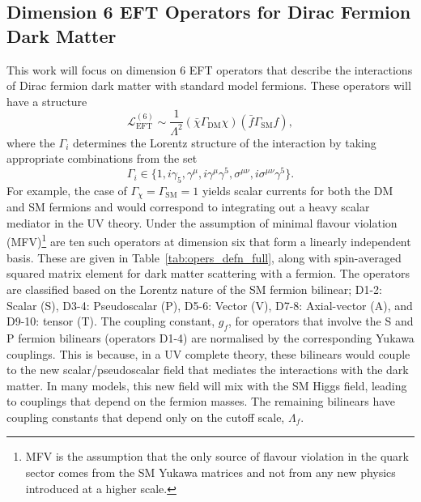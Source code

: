 \subsection{Dimension 6 EFT Operators for Dirac Fermion Dark Matter}
This work will focus on dimension 6 EFT operators that describe the interactions of Dirac fermion dark matter with standard model fermions. These operators will have a structure 
\begin{equation}
    \mathcal{L}_\mathrm{EFT}^{(6)} \sim \frac{1}{\Lambda^2}(\bar{\chi}\Gamma_\mathrm{DM} \chi)(\bar{f}\Gamma_{\mathrm{SM}}f),
\end{equation}
where the $\Gamma_i$ determines the Lorentz structure of the interaction by taking appropriate combinations from the set
\begin{equation}
    \Gamma_i\in \{1, i\gamma_5, \gamma^\mu, i\gamma^\mu \gamma^5, \sigma^{\mu\nu}, i \sigma^{\mu\nu}\gamma^5\}.
\end{equation}
For example, the case of $\Gamma_\chi = \Gamma_\mathrm{SM} = 1$ yields scalar currents for both the DM and SM fermions and would correspond to integrating out a heavy scalar mediator in the UV theory. Under the assumption of minimal flavour violation (MFV)\footnote{MFV is the assumption that the only source of flavour violation in the quark sector comes from the SM Yukawa matrices and not from any new physics introduced at a higher scale.} are ten such operators at dimension six that form a linearly independent basis. These are given in Table~\ref{tab:opers_defn_full}, along with spin-averaged squared matrix element for dark matter scattering with a fermion. 
The operators are classified based on the Lorentz nature of the SM fermion bilinear; D1-2: Scalar (S), D3-4: Pseudoscalar (P), D5-6: Vector (V), D7-8: Axial-vector (A), and D9-10: tensor (T).
The coupling constant, $g_f$, for operators that involve the S and P fermion bilinears (operators D1-4) are normalised by the corresponding Yukawa couplings. This is because, in a UV complete theory, these bilinears would couple to the new scalar/pseudoscalar field that mediates the interactions with the dark matter. In many models, this new field will mix with the SM Higgs field, leading to couplings that depend on the fermion masses. The remaining bilinears have coupling constants that depend only on the cutoff scale, $\Lambda_f$.


